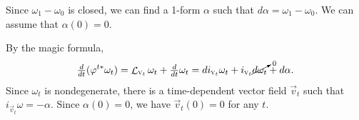 Since $\omega_1-\omega_0$ is closed, we can find a 1-form $\alpha$ such that
$d\alpha=\omega_1-\omega_0$.
We can assume that $\alpha(0)=0$.

By the magic formula,
\[\tfrac{d}{dt}(\varphi^{t*}\omega_t)
=
\mathop{\mathcal{L}}\nolimits_{\text{\rm \textsc{v}}_t}\omega_t+\tfrac{d}{dt}\omega_t
=
di_{\text{\rm \textsc{v}}_t}\omega_t+i_{\text{\rm \textsc{v}}_t}\cancelto{{}_0}{d\omega_t}+d\alpha.\]
Since $\omega_t$ is nondegenerate, there is a time-dependent vector field $\vec v_t$ such that $i_{\vec v_t}\omega=-\alpha$.
Since $\alpha(0)=0$, we have $\vec v_t(0)=0$ for any $t$.
\qeds

